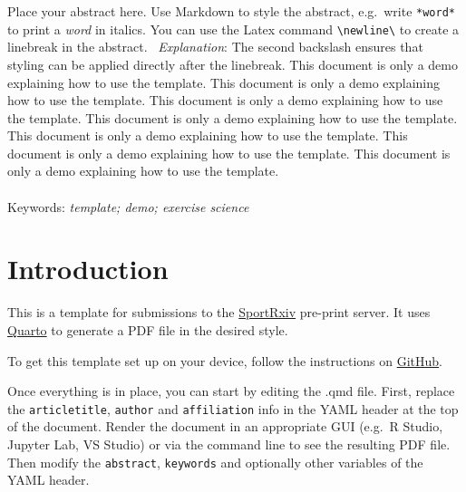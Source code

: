 \documentclass[
]{article}
\begin{document}
\begin{abstractbox}
  Place your abstract here. Use Markdown to style the abstract,
e.g.~write \texttt{*word*} to print a \emph{word} in italics. You can
use the Latex command \texttt{\textbackslash{}newline\textbackslash{}}
to create a linebreak in the abstract. \newline~\emph{Explanation}: The
second backslash ensures that styling can be applied directly after the
linebreak. This document is only a demo explaining how to use the
template. This document is only a demo explaining how to use the
template. This document is only a demo explaining how to use the
template. This document is only a demo explaining how to use the
template. This document is only a demo explaining how to use the
template. This document is only a demo explaining how to use the
template. This document is only a demo explaining how to use the
template. 
    \\ \\
  Keywords: \emph{template; demo; exercise science}
   
\end{abstractbox}\ifdefined\Shaded\renewenvironment{Shaded}{\begin{tcolorbox}[borderline west={3pt}{0pt}{shadecolor}, enhanced, frame hidden, breakable, sharp corners, boxrule=0pt, interior hidden]}{\end{tcolorbox}}\fi

\hypertarget{introduction}{%
\section{Introduction}\label{introduction}}

\textcolor{SRXIVgreen}{This is a template for submissions} to the
\href{https://sportrxiv.org/index.php/server}{SportRxiv} pre-print
server. It uses \href{https://quarto.org/}{Quarto} to generate a PDF
file in the desired style.

To get this template set up on your device, follow the instructions on
\href{https://github.com/smnnlt/sportrxiv/}{GitHub}.

Once everything is in place, you can start by editing the .qmd file.
First, replace the \texttt{articletitle}, \texttt{author} and
\texttt{affiliation} info in the YAML header at the top of the document.
Render the document in an appropriate GUI (e.g.~R Studio, Jupyter Lab,
VS Studio) or via the command line to see the resulting PDF file. Then
modify the \texttt{abstract}, \texttt{keywords} and optionally other
variables of the YAML header.
\end{document}
